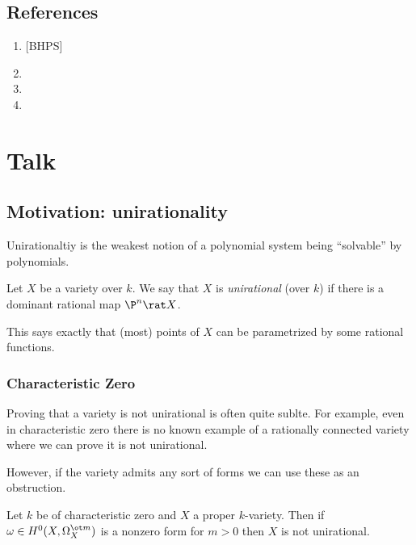 \documentclass[12pt]{article}
\begin{document}
\subsection{References}

\begin{enumerate}
\item {}[BHPS]
\item {}
\item {}
\item {}
\end{enumerate}

\newpage

\section{Talk}

\subsection{Motivation: unirationality}

Unirationaltiy is the weakest notion of a polynomial system being ``solvable'' by polynomials. 

\begin{defn}
Let $X$ be a variety over $k$. We say that $X$ is \textit{unirational} (over $k$) if there is a dominant rational map $\P^n \rat X$.
\end{defn}

This says exactly that (most) points of $X$ can be parametrized by some rational functions. 

\subsubsection{Characteristic Zero}

Proving that a variety is not unirational is often quite sublte. For example, even in characteristic zero there is no known example of a rationally connected variety where we can prove it is not unirational.
\par 
However, if the variety admits any sort of forms we can use these as an obstruction.

\begin{prop}
Let $k$ be of characteristic zero and $X$ a proper $k$-variety. Then if $\omega \in H^0(X, \Omega_X^{\ot m})$ is a nonzero form for $m > 0$ then $X$ is not unirational.
\end{prop}
\end{document}

